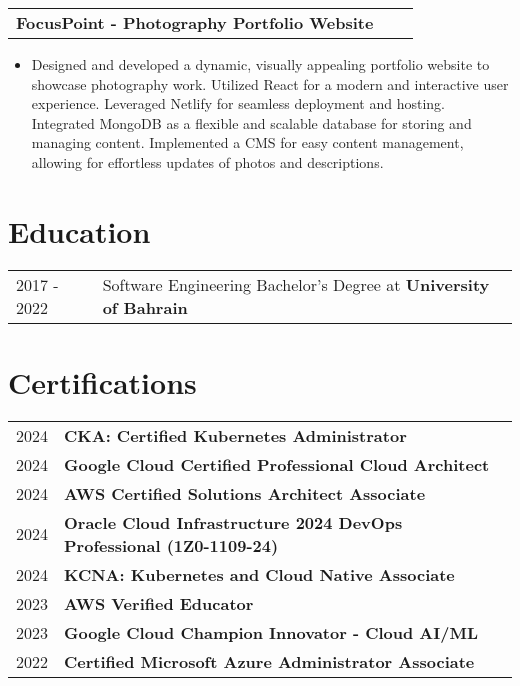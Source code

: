 \documentclass[a4paper,11pt]{article}
\makeatletter
\newenvironment{projectlong}[2]
    {
    \begin{tabularx}{\linewidth}{@{}l X r@{}}
    \textbf{#1} & \hfill &  #2 \\[3.75pt]
    \end{tabularx}
    \begin{minipage}[t]{\linewidth}
    \begin{itemize}[nosep,after=\strut, leftmargin=1em, itemsep=3pt,label=--]
    }
    {
    \end{itemize}
    \end{minipage}    
    }
\makeatother
\begin{document}
\begin{projectlong}{FocusPoint - Photography Portfolio Website}{}
    \item Designed and developed a dynamic, visually appealing portfolio website to showcase photography work.
Utilized React for a modern and interactive user experience.
Leveraged Netlify for seamless deployment and hosting.
Integrated MongoDB as a flexible and scalable database for storing and managing content.
Implemented a CMS for easy content management, allowing for effortless updates of photos and descriptions.
\end{projectlong}




\section{Education}
\begin{tabularx}{\linewidth}{@{}l X@{}}	
2017 - 2022 & Software Engineering Bachelor's Degree at \textbf{University of Bahrain}  \\ 
\end{tabularx}

\section{Certifications}
\begin{tabularx}{\linewidth}{@{}l X@{}}	
2024 & \textbf{CKA: Certified Kubernetes Administrator}  \\ 
2024 & \textbf{Google Cloud Certified Professional Cloud Architect} \\
2024 & \textbf{AWS Certified Solutions Architect Associate}  \\
2024 & \textbf{Oracle Cloud Infrastructure 2024 DevOps Professional (1Z0-1109-24)} \\
2024 & \textbf{KCNA: Kubernetes and Cloud Native Associate}  \\ 
2023 & \textbf{AWS Verified Educator}  \\ 
2023 & \textbf{Google Cloud Champion Innovator - Cloud AI/ML}  \\ 
2022 & \textbf{Certified Microsoft Azure Administrator Associate}  \\ 
\end{tabularx}
\end{document}

